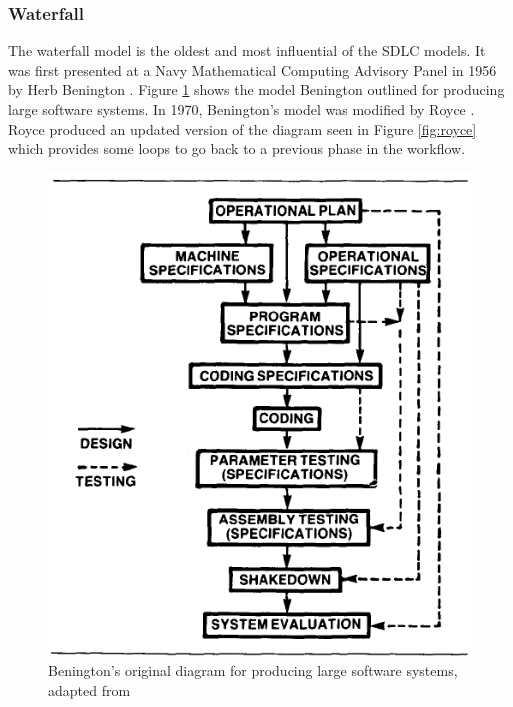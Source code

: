 \documentclass[SDSUThesis.tex]{subfiles}
\begin{document}
    
    \subsubsection{Waterfall}
        The waterfall model is the oldest and most influential of the SDLC models. 
        It was first presented at a Navy Mathematical Computing Advisory Panel in 1956
        by Herb Benington \cite{Benington1987}. Figure \ref{fig:benington} shows
        the model Benington outlined for producing large software systems.  
        In 1970, Benington's model was modified by Royce \cite{Royce1987}.  Royce
        produced an updated version of the diagram seen in Figure \ref{fig:royce}
        which provides some loops to go back to a previous phase in the workflow.
    
        \begin{figure}
            \centering
            \includegraphics[scale=.5]{benington_waterfall.PNG}
            \caption[Benington's original diagram for producing large software systems]
                    {Benington's original diagram for producing large software 
                        systems, adapted from \cite{Benington1987}}
            \label{fig:benington}
        \end{figure}%
\end{document}
